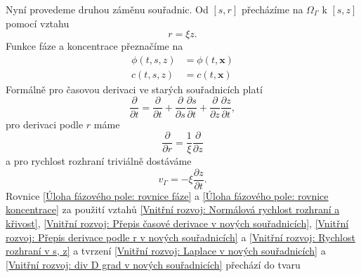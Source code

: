 Nyní provedeme druhou záměnu souřadnic.
Od \([s, r]\) přecházíme na \(\Omega_\Gamma\) k \([s, z]\) pomocí vztahu
\begin{equation}
    r = \xi z.
\end{equation}
Funkce fáze a koncentrace přeznačíme na
\begin{align}
    \phi(t, s, z) &= \phi(t, \mathbf{x})\\
    c(t, s, z) &= c(t, \mathbf{x})
\end{align}
Formálně pro časovou derivaci ve starých souřadnicích platí
\begin{equation}\label{Vnitřní rozvoj: Přepis časové derivace v nových souřadnicích}
    \frac{\partial}{\partial t} = \frac{\partial}{\partial t} + \frac{\partial}{\partial s}\frac{\partial s}{\partial t} + \frac{\partial}{\partial z}\frac{\partial z}{\partial t},
\end{equation}
pro derivaci podle \(r\) máme
\begin{equation}\label{Vnitřní rozvoj: Přepis derivace podle r v nových souřadnicích}
    \frac{\partial}{\partial r} = \frac{1}{\xi}\frac{\partial}{\partial z}
\end{equation}
a pro rychlost rozhraní triviálně dostáváme
\begin{equation}\label{Vnitřní rozvoj: Rychlost rozhraní v s, z}
    v_\Gamma = -\xi \frac{\partial z}{\partial t}.
\end{equation}
Rovnice \eqref{Úloha fázového pole: rovnice fáze} a \eqref{Úloha fázového pole: rovnice koncentrace} za použití vztahů  \eqref{Vnitřní rozvoj: Normálová rychlost rozhraní a křivost}, \eqref{Vnitřní rozvoj: Přepis časové derivace v nových souřadnicích}, \eqref{Vnitřní rozvoj: Přepis derivace podle r v nových souřadnicích} a \eqref{Vnitřní rozvoj: Rychlost rozhraní v s, z} a tvrzení \ref{Vnitřní rozvoj: Laplace v nových souřadnicích} a \ref{Vnitřní rozvoj: div D grad v nových souřadnicích} přechází do tvaru
